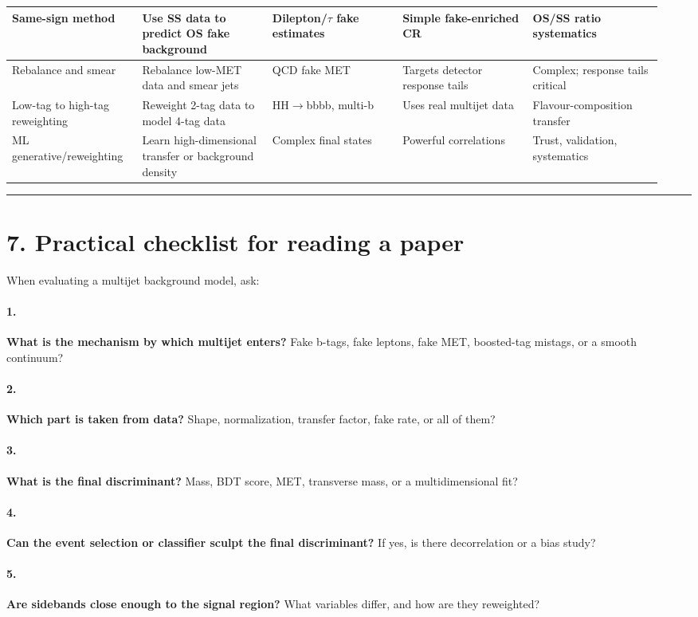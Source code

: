 \documentclass[11pt]{article}
\begin{document}
\begin{center}
\begin{longtable}{|p{0.19\linewidth}|p{0.19\linewidth}|p{0.19\linewidth}|p{0.19\linewidth}|p{0.19\linewidth}|}
Same-sign method & Use SS data to predict OS fake background & Dilepton/$\tau$ fake estimates & Simple fake-enriched CR & OS/SS ratio systematics \\ \hline
Rebalance and smear & Rebalance low-MET data and smear jets & QCD fake MET & Targets detector response tails & Complex; response tails critical \\ \hline
Low-tag to high-tag reweighting & Reweight 2-tag data to model 4-tag data & HH$\to$bbbb, multi-b & Uses real multijet data & Flavour-composition transfer \\ \hline
ML generative/reweighting & Learn high-dimensional transfer or background density & Complex final states & Powerful correlations & Trust, validation, systematics \\ \hline
\end{longtable}\end{center}\normalsize

\bigskip\hrule\bigskip

\section{7. Practical checklist for reading a paper}

When evaluating a multijet background model, ask:

\paragraph{1.} \textbf{What is the mechanism by which multijet enters?} Fake b-tags, fake leptons, fake MET, boosted-tag mistags, or a smooth continuum?
\paragraph{2.} \textbf{Which part is taken from data?} Shape, normalization, transfer factor, fake rate, or all of them?
\paragraph{3.} \textbf{What is the final discriminant?} Mass, BDT score, MET, transverse mass, or a multidimensional fit?
\paragraph{4.} \textbf{Can the event selection or classifier sculpt the final discriminant?} If yes, is there decorrelation or a bias study?
\paragraph{5.} \textbf{Are sidebands close enough to the signal region?} What variables differ, and how are they reweighted?
\end{document}

